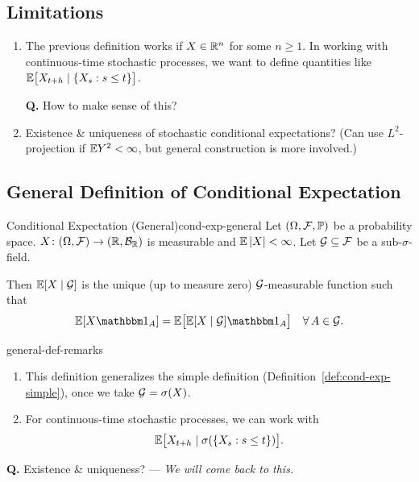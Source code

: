 \subsection{Limitations}

\begin{enumerate}[label=(\roman*)]
    \item The previous definition works if $X \in \mathbb{R}^n$ for some $n \geq 1$. In working with continuous-time stochastic processes, we want to define quantities like $\mathbb{E}\bigl[X_{t+h} \mid \{X_s : s \leq t\}\bigr]$.

    \textbf{Q.} How to make sense of this?

    \item Existence \& uniqueness of stochastic conditional expectations? (Can use $L^2$-projection if $\mathbb{E} Y^2 < \infty$, but general construction is more involved.)
\end{enumerate}

\subsection{General Definition of Conditional Expectation}

\begin{definition}{Conditional Expectation (General)}{cond-exp-general}
    Let $(\Omega, \mathcal{F}, \mathbb{P})$ be a probability space. $X \colon (\Omega, \mathcal{F}) \to (\mathbb{R}, \mathcal{B}_{\mathbb{R}})$ is measurable and $\mathbb{E}\left|X\right| < \infty$. Let $\mathcal{G} \subseteq \mathcal{F}$ be a sub-$\sigma$-field.

    Then $\mathbb{E}[X \mid \mathcal{G}]$ is the unique (up to measure zero) $\mathcal{G}$-measurable function such that
    \[
        \E[X \ind_A] = \E\bigl[\E[X \mid \G] \ind_A\bigr] \quad \forall\, A \in \G.
    \]
\end{definition}

\begin{remark}{}{general-def-remarks}
    \begin{enumerate}[label=(\arabic*)]
        \item This definition generalizes the simple definition (Definition~\ref{def:cond-exp-simple}), once we take $\mathcal{G} = \sigma(X)$.
        \item For continuous-time stochastic processes, we can work with
        \[
            \mathbb{E}\bigl[X_{t+h} \mid \sigma(\{X_s : s \leq t\})\bigr].
        \]
    \end{enumerate}
\end{remark}

\textbf{Q.} Existence \& uniqueness? --- \textit{We will come back to this.}

